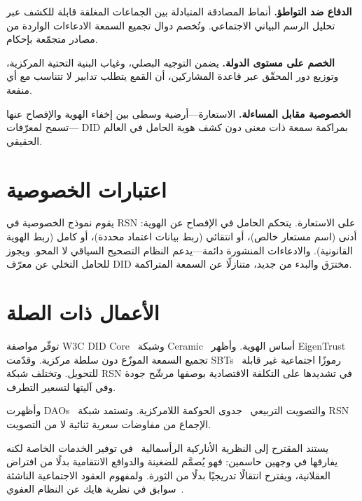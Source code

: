 \documentclass[11pt,a4paper,twocolumn]{article}
\begin{document}
\textbf{الدفاع ضد التواطؤ.} أنماط المصادقة المتبادلة بين الجماعات المغلقة قابلة للكشف عبر تحليل الرسم البياني الاجتماعي. وتُخصم دوال تجميع السمعة الادعاءات الواردة من مصادر متجمّعة بإحكام.

\textbf{الخصم على مستوى الدولة.} يضمن التوجيه البصلي، وغياب البنية التحتية المركزية، وتوزيع دور المحقّق عبر قاعدة المشاركين، أن القمع يتطلب تدابير لا تتناسب مع أي منفعة.

\textbf{الخصوصية مقابل المساءلة.} الاستعارة---أرضية وسطى بين إخفاء الهوية والإفصاح عنها---تسمح لمعرّفات DID بمراكمة سمعة ذات معنى دون كشف هوية الحامل في العالم الحقيقي.

\section{اعتبارات الخصوصية}

يقوم نموذج الخصوصية في RSN على الاستعارة. يتحكم الحامل في الإفصاح عن الهوية: أدنى (اسم مستعار خالص)، أو انتقائي (ربط بيانات اعتماد محددة)، أو كامل (ربط الهوية القانونية). والادعاءات المنشورة دائمة---يدعم النظام التصحيح السياقي لا المحو. ويجوز للحامل التخلي عن معرّف DID مخترَق والبدء من جديد، متنازلًا عن السمعة المتراكمة.

\section{الأعمال ذات الصلة}

توفّر مواصفة W3C DID Core~\cite{did2022} وشبكة Ceramic~\cite{ceramic2023} أساس الهوية. وأظهر EigenTrust~\cite{kamvar2003} تجميع السمعة الموزّع دون سلطة مركزية. وقدّمت SBTs~\cite{weyl2022} رموزًا اجتماعية غير قابلة للتحويل. وتختلف شبكة RSN في تشديدها على التكلفة الاقتصادية بوصفها مرشّح جودة وفي آليتها لتسعير التطرف.

وأظهرت DAOs~\cite{buterin2014} والتصويت التربيعي~\cite{buterin2019} جدوى الحوكمة اللامركزية. وتستمد شبكة RSN الإجماع من مفاوضات سعرية ثنائية لا من التصويت.

يستند المقترح إلى النظرية الأناركية الرأسمالية~\cite{rothbard1973,hoppe2001} في توفير الخدمات الخاصة لكنه يفارقها في وجهين حاسمين: فهو يُصمَّم للضغينة والدوافع الانتقامية بدلًا من افتراض العقلانية، ويقترح انتقالًا تدريجيًا بدلًا من الثورة. ولمفهوم العقود الاجتماعية الناشئة سوابق في نظرية هايك عن النظام العفوي~\cite{hayek1973}.
\end{document}
